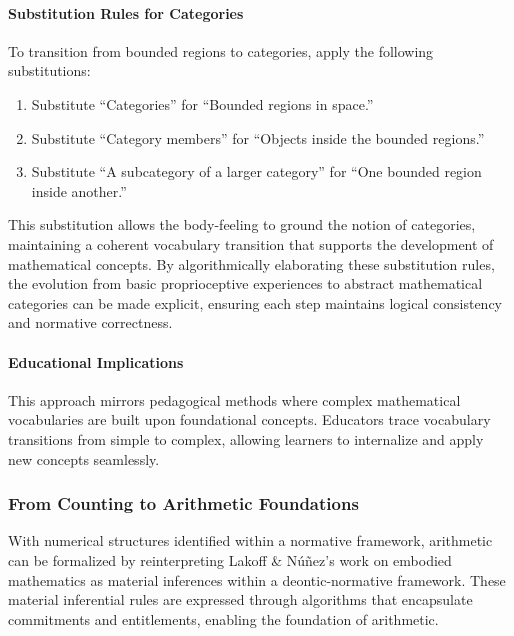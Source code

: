 \documentclass[12pt]{book}
\begin{document}
\paragraph{Substitution Rules for Categories}

To transition from bounded regions to categories, apply the following substitutions:

\begin{enumerate}
    \item Substitute ``Categories'' for ``Bounded regions in space.''
    \item Substitute ``Category members'' for ``Objects inside the bounded regions.''
    \item Substitute ``A subcategory of a larger category'' for ``One bounded region inside another.''
\end{enumerate}

This substitution allows the body-feeling to ground the notion of categories, maintaining a coherent vocabulary transition that supports the development of mathematical concepts. By algorithmically elaborating these substitution rules, the evolution from basic proprioceptive experiences to abstract mathematical categories can be made explicit, ensuring each step maintains logical consistency and normative correctness.

\paragraph{Educational Implications}

This approach mirrors pedagogical methods where complex mathematical vocabularies are built upon foundational concepts. Educators trace vocabulary transitions from simple to complex, allowing learners to internalize and apply new concepts seamlessly.


\subsubsection{From Counting to Arithmetic Foundations}\label{from-counting-to-arithmetic-foundations}

With numerical structures identified within a normative framework, arithmetic can be formalized by reinterpreting Lakoff \& Núñez's \parencite*{Lakoff2000} work on embodied mathematics as material inferences within a deontic-normative framework. These material inferential rules are expressed through algorithms that encapsulate commitments and entitlements, enabling the foundation of arithmetic.
\end{document}
